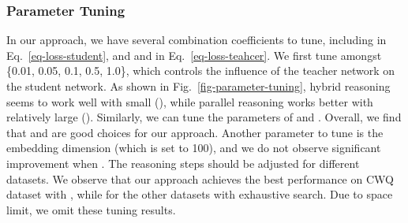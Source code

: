\subsubsection{Parameter Tuning} 
In our approach, we have several combination coefficients to tune, including  in Eq.~\ref{eq-loss-student}, and  and  in Eq.~\ref{eq-loss-teahcer}. We first tune  amongst \{0.01, 0.05, 0.1, 0.5, 1.0\}, which controls the influence of the teacher network on the student network. 
As shown in Fig.~\ref{fig-parameter-tuning},  hybrid reasoning seems to work
well with small  (), while parallel reasoning works better with relatively large  (). 
Similarly, we can tune the parameters of  and .
Overall, we find that    and  are good choices for our approach. Another parameter to tune is the embedding dimension  (which is set to 100), and we do not observe significant improvement when . 
The reasoning steps  should be adjusted for different datasets. We observe that our approach achieves the best performance on CWQ dataset with , while  for the other datasets with exhaustive search. Due to space limit, we omit these tuning results. 












